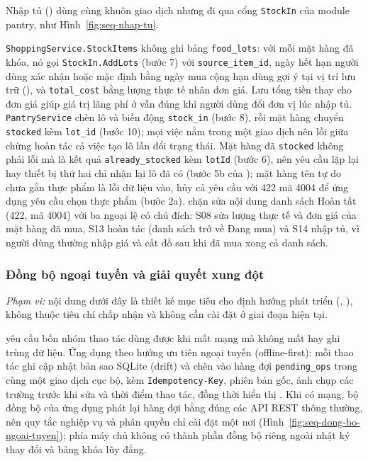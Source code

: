 Nhập tủ () dùng cùng khuôn giao dịch nhưng đi qua cổng \texttt{StockIn} của module pantry, như Hình~\ref{fig:seq-nhap-tu}.


\texttt{ShoppingService.StockItems} không ghi bảng \texttt{food\_lots}: với mỗi mặt hàng đã khóa, nó gọi \texttt{StockIn.AddLots} (bước 7) với \texttt{source\_item\_id}, ngày hết hạn người dùng xác nhận hoặc mặc định bằng ngày mua cộng hạn dùng gợi ý tại vị trí lưu trữ (), và \texttt{total\_cost} bằng lượng thực tế nhân đơn giá. Lưu tổng tiền thay cho đơn giá giúp giá trị lãng phí ở  vẫn đúng khi người dùng đổi đơn vị lúc nhập tủ. \texttt{PantryService} chèn lô và biến động \texttt{stock\_in} (bước 8), rồi mặt hàng chuyển \texttt{stocked} kèm \texttt{lot\_id} (bước 10); mọi việc nằm trong một giao dịch nên lỗi giữa chừng hoàn tác cả việc tạo lô lẫn đổi trạng thái. Mặt hàng đã \texttt{stocked} không phải lỗi mà là kết quả \texttt{already\_stocked} kèm \texttt{lotId} (bước 6), nên yêu cầu lặp lại hay thiết bị thứ hai chỉ nhận lại lô đã có (bước 5b của ); mặt hàng tên tự do chưa gắn thực phẩm là lỗi dữ liệu vào, hủy cả yêu cầu với 422 mã 4004 để ứng dụng yêu cầu chọn thực phẩm (bước 2a).  chặn sửa nội dung danh sách Hoàn tất (422, mã 4004) với ba ngoại lệ có chủ đích: S08 sửa lượng thực tế và đơn giá của mặt hàng đã mua, S13 hoàn tác (danh sách trở về Đang mua) và S14 nhập tủ, vì người dùng thường nhập giá và cất đồ sau khi đã mua xong cả danh sách.

\subsubsection{Đồng bộ ngoại tuyến và giải quyết xung đột}\label{sssec:kt-ngoai-tuyen}

\emph{Phạm vi:} nội dung dưới đây là thiết kế mục tiêu cho định hướng phát triển (, ), không thuộc tiêu chí chấp nhận và không cần cài đặt ở giai đoạn hiện tại.

 yêu cầu bốn nhóm thao tác dùng được khi mất mạng mà không mất hay ghi trùng dữ liệu. Ứng dụng theo hướng ưu tiên ngoại tuyến (offline-first): mỗi thao tác ghi cập nhật bản sao SQLite (drift) và chèn vào hàng đợi \texttt{pending\_ops} trong cùng một giao dịch cục bộ, kèm \texttt{Idempotency-Key}, phiên bản gốc, ảnh chụp các trường trước khi sửa và thời điểm thao tác, đồng thời hiển thị . Khi có mạng, bộ đồng bộ của ứng dụng phát lại hàng đợi bằng đúng các API REST thông thường, nên quy tắc nghiệp vụ và phân quyền chỉ cài đặt một nơi (Hình~\ref{fig:seq-dong-bo-ngoai-tuyen}); phía máy chủ không có thành phần đồng bộ riêng ngoài nhật ký thay đổi và bảng khóa lũy đẳng.

